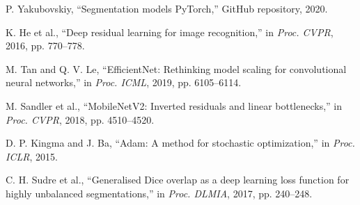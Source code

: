 \documentclass{article}
\begin{document}
\begin{thebibliography}{99}
P. Yakubovskiy, ``Segmentation models PyTorch,'' GitHub repository, 2020.

K. He et al., ``Deep residual learning for image recognition,'' in \textit{Proc. CVPR}, 2016, pp. 770--778.

M. Tan and Q. V. Le, ``EfficientNet: Rethinking model scaling for convolutional neural networks,'' in \textit{Proc. ICML}, 2019, pp. 6105--6114.

M. Sandler et al., ``MobileNetV2: Inverted residuals and linear bottlenecks,'' in \textit{Proc. CVPR}, 2018, pp. 4510--4520.

D. P. Kingma and J. Ba, ``Adam: A method for stochastic optimization,'' in \textit{Proc. ICLR}, 2015.

C. H. Sudre et al., ``Generalised Dice overlap as a deep learning loss function for highly unbalanced segmentations,'' in \textit{Proc. DLMIA}, 2017, pp. 240--248.

\end{thebibliography}
\end{document}
